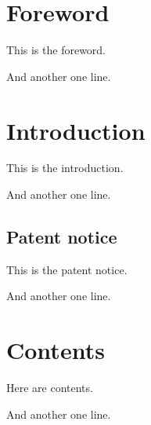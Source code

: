 \documentclass{IsoStandardDocument}
\begin{document}
  \section*{Foreword}

  This is the foreword.

  And another one line.

  \section*{Introduction}

  This is the introduction.

  And another one line.

  \subsection*{Patent notice}

  This is the patent notice.

  And another one line.

  \section{Contents}

  Here are contents.

  And another one line.
\end{document}
